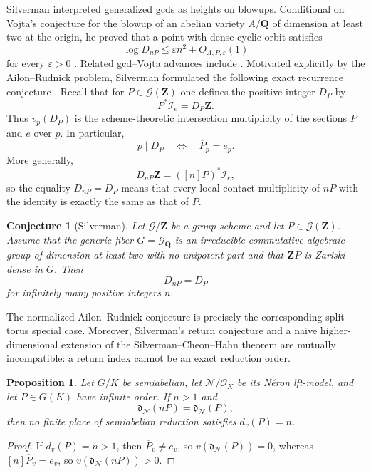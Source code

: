 \documentclass[11pt,letterpaper,reqno]{amsart}
\newtheorem{proposition}[theorem]{Proposition}
\newtheorem{conjecture}[theorem]{Conjecture}
\theoremstyle{definition}
\theoremstyle{remark}
\newcommand{\Q}{\mathbf Q}
\newcommand{\Z}{\mathbf Z}
\newcommand{\OK}{\mathcal O_K}
\newcommand{\Ner}{\mathcal N}
\begin{document}
Silverman interpreted generalized gcds as heights on blowups.  Conditional on
Vojta's conjecture for the blowup of an abelian variety $A/\Q$ of dimension at
least two at the origin, he proved that a point with dense cyclic orbit
satisfies
\[
 \log D_{nP}\le \varepsilon n^2+O_{A,P,\varepsilon}(1)
\]
for every $\varepsilon>0$ \cite[Proposition~9]{Silverman2005}.
Related gcd--Vojta advances include \cite{Levin2019,Yasufuku2026}.
Motivated explicitly by the Ailon--Rudnick problem, Silverman formulated the
following exact recurrence conjecture \cite[Conjecture~10]{Silverman2005}.
Recall that for $P\in\mathcal G(\mathbf Z)$ one defines the positive integer
$D_P$ by
\[
        P^*\mathcal I_e=D_P\mathbf Z.
\]
Thus \(v_p(D_P)\) is the scheme-theoretic intersection multiplicity of the
sections \(P\) and \(e\) over \(p\).  In particular,
\[
        p\mid D_P
        \quad\Longleftrightarrow\quad
        \overline P_p=e_p.
\]
More generally,
\[
        D_{nP}\mathbf Z=([n]P)^*\mathcal I_e,
\]
so the equality \(D_{nP}=D_P\) means that every local contact multiplicity
of \(nP\) with the identity is exactly the same as that of \(P\).


\begin{conjecture}[Silverman]\label{conj:silverman}
Let $\mathcal G/\Z$ be a group scheme and let $P\in\mathcal G(\Z)$.  Assume
that the generic fiber $G=\mathcal G_{\Q}$ is an irreducible commutative
algebraic group of dimension at least two with no unipotent part and that
$\Z P$ is Zariski dense in $G$.  Then
\[
 D_{nP}=D_P
\]
for infinitely many positive integers $n$.
\end{conjecture}

The normalized Ailon--Rudnick conjecture is precisely the corresponding
split-torus special case.  Moreover, Silverman's return conjecture and a
naive higher-dimensional extension of the
Silverman--Cheon--Hahn theorem are mutually incompatible: a return
index cannot be an exact reduction order.

\begin{proposition}
\label{prop:intro-return-excludes-order}
Let $G/K$ be semiabelian, let $\Ner/\OK$ be its N\'eron lft-model, and let
$P\in G(K)$ have infinite order.  If $n>1$ and
\[
 \mathfrak d_{\Ner}(nP)=\mathfrak d_{\Ner}(P),
\]
then no finite place of semiabelian reduction satisfies $d_v(P)=n$.
\end{proposition}

\begin{proof}
If $d_v(P)=n>1$, then $\overline P_v\ne e_v$, so
$v(\mathfrak d_{\Ner}(P))=0$, whereas $[n]\overline P_v=e_v$, so
$v(\mathfrak d_{\Ner}(nP))>0$.
\end{proof}
\end{document}
